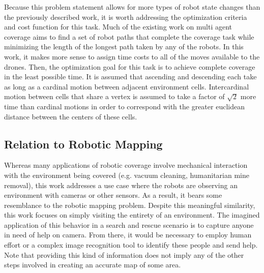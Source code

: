 Because this problem statement allows for more types of robot state changes than the previously described work, it is worth addressing the optimization criteria and cost function for this task. Much of the existing work on multi agent coverage aims to find a set of robot paths that complete the coverage task while minimizing the length of the longest path taken by any of the robots. In this work, it makes more sense to assign time costs to all of the moves available to the drones. Then, the optimization goal for this task is to achieve complete coverage in the least possible time. It is assumed that ascending and descending each take as long as a cardinal motion between adjacent environment cells. Intercardinal motion between cells that share a vertex is assumed to take a factor of $ \sqrt{2} $ more time than cardinal motions in order to correspond with the greater euclidean distance between the centers of these cells.

\subsection{Relation to Robotic Mapping}

Whereas many applications of robotic coverage involve mechanical interaction with the environment being covered (e.g. vacuum cleaning, humanitarian mine removal), this work addresses a use case where the robots are observing an environment with cameras or other sensors. As a result, it bears some resemblance to the robotic mapping problem. Despite this meaningful similarity, this work focuses on simply visiting the entirety of an environment. The imagined application of this behavior in a search and rescue scenario is to capture anyone in need of help on camera. From there, it would be necessary to employ human effort or a complex image recognition tool to identify these people and send help. Note that providing this kind of information does not imply any of the other steps involved in creating an accurate map of some area.

